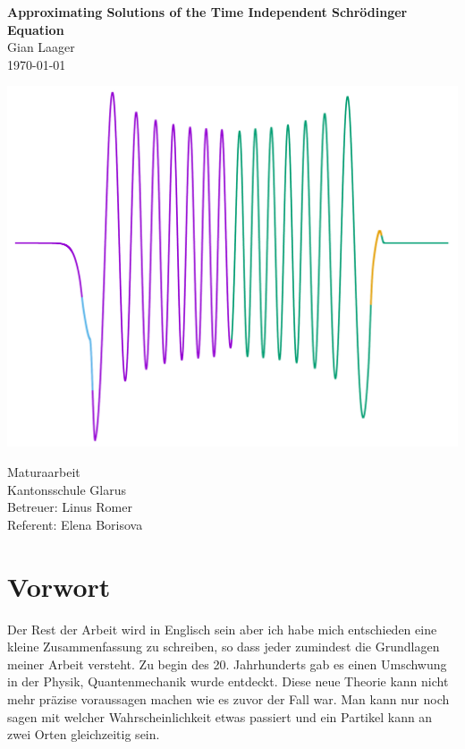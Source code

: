 \documentclass[11pt,DIV=10,final]{scrreprt} %
\begin{document}
\begin{titlepage}
\mbox{}\vspace{0.1\textheight}
\begin{center}
\textbf{\Huge Approximating Solutions of the Time Independent Schrödinger Equation}\\[3ex]
Gian Laager\\
\today
\vspace{0.05\textheight}
\begin{center}
	\includegraphics[width=.7\textwidth]{plots/wave_func_square.pdf}
\end{center}
\vspace{0.05\textheight}
Maturaarbeit\\
Kantonsschule Glarus\\
Betreuer: Linus Romer\\
Referent: Elena Borisova
\end{center}
\end{titlepage}


\tableofcontents

\pagebreak[4]

\chapter*{Vorwort}
Der Rest der Arbeit wird in Englisch sein aber ich habe mich entschieden eine kleine Zusammenfassung zu schreiben, so dass jeder zumindest die Grundlagen meiner Arbeit versteht.
Zu begin des 20. Jahrhunderts gab es einen Umschwung in der Physik, Quantenmechanik wurde entdeckt. Diese neue Theorie kann nicht mehr präzise voraussagen machen wie es zuvor der Fall war.
Man kann nur noch sagen mit welcher Wahrscheinlichkeit etwas passiert und ein Partikel kann an zwei Orten gleichzeitig sein.
\end{document}
